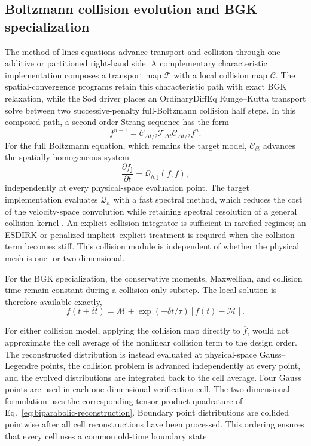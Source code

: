 \documentclass[preprint,3p,12pt]{elsarticle}
\newcommand{\vct}[1]{\boldsymbol{#1}}
\newcommand{\avg}[1]{\overline{#1}}
\begin{document}
\subsection{Boltzmann collision evolution and BGK specialization}

The method-of-lines equations advance transport and collision through one additive or partitioned right-hand side. A complementary characteristic implementation composes a transport map $\mathcal{T}$ with a local collision map $\mathcal{C}$. The spatial-convergence programs retain this characteristic path with exact BGK relaxation, while the Sod driver places an OrdinaryDiffEq Runge--Kutta transport solve between two successive-penalty full-Boltzmann collision half steps. In this composed path, a second-order Strang sequence has the form \cite{strang1968construction}
\begin{equation}
  f^{n+1}
  = \mathcal{C}_{\Delta t/2}
    \mathcal{T}_{\Delta t}
    \mathcal{C}_{\Delta t/2}f^n.
  \label{eq:strang}
\end{equation}
For the full Boltzmann equation, which remains the target model, $\mathcal{C}_{\delta t}$ advances the spatially homogeneous system
\begin{equation}
  \frac{\partial f_{\vct{j}}}{\partial t}
  =\mathcal{Q}_{h,\vct{j}}(f,f),
  \label{eq:homogeneous-boltzmann}
\end{equation}
independently at every physical-space evaluation point. The target implementation evaluates $\mathcal{Q}_h$ with a fast spectral method, which reduces the cost of the velocity-space convolution while retaining spectral resolution of a general collision kernel \cite{mouhot2006fast,xiao2021flux}. An explicit collision integrator is sufficient in rarefied regimes; an ESDIRK or penalized implicit--explicit treatment is required when the collision term becomes stiff. This collision module is independent of whether the physical mesh is one- or two-dimensional.

For the BGK specialization, the conservative moments, Maxwellian, and collision time remain constant during a collision-only substep. The local solution is therefore available exactly,
\begin{equation}
  f(t+\delta t)
  = \mathcal{M}
  + \exp(-\delta t/\tau)\left[f(t)-\mathcal{M}\right].
  \label{eq:exact-relaxation}
\end{equation}

For either collision model, applying the collision map directly to $\avg{f}_i$ would not approximate the cell average of the nonlinear collision term to the design order. The reconstructed distribution is instead evaluated at physical-space Gauss--Legendre points, the collision problem is advanced independently at every point, and the evolved distributions are integrated back to the cell average. Four Gauss points are used in each one-dimensional verification cell. The two-dimensional formulation uses the corresponding tensor-product quadrature of Eq.~\eqref{eq:biparabolic-reconstruction}. Boundary point distributions are collided pointwise after all cell reconstructions have been processed. This ordering ensures that every cell uses a common old-time boundary state.
\end{document}

